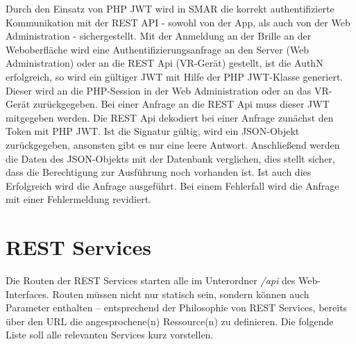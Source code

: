 Durch den Einsatz von PHP JWT wird in \ac{SMAR} die korrekt authentifizierte Kommunikation mit der REST API - sowohl von der App, als auch von der Web Administration - sichergestellt.
Mit der Anmeldung an der Brille \bzw an der Weboberfläche wird eine Authentifizierungsanfrage an den Server (Web Administration) oder an die REST Api (\acs{VR}-Gerät) gestellt, ist die \acl{AuthN} erfolgreich, so wird ein gültiger \ac{JWT} mit Hilfe der PHP JWT-Klasse generiert. Dieser wird an die PHP-Session in der Web Administration oder an das \acs{VR}-Gerät zurückgegeben. Bei einer Anfrage an die REST Api muss dieser \acs{JWT} mitgegeben werden. Die REST Api dekodiert bei einer Anfrage zunächst den Token mit PHP JWT. Ist die Signatur gültig, wird ein JSON-Objekt zurückgegeben, ansonsten gibt es nur eine leere Antwort. Anschließend werden die Daten des JSON-Objekts mit der Datenbank verglichen, dies stellt sicher, dass die Berechtigung zur Ausführung noch vorhanden ist. Ist auch dies Erfolgreich wird die Anfrage ausgeführt. Bei einem Fehlerfall wird die Anfrage mit einer Fehlermeldung revidiert.

\section{REST Services}
Die Routen der \acs{REST} Services starten alle im Unterordner \emph{/api} des Web-Interfaces. Routen müssen nicht nur statisch sein, sondern können auch Parameter enthalten -- entsprechend der Philosophie von \acs{REST} Services, bereits über den \acs{URL} die angesprochene(n) Ressource(n) zu definieren. Die folgende Liste soll alle relevanten Services kurz vorstellen.

